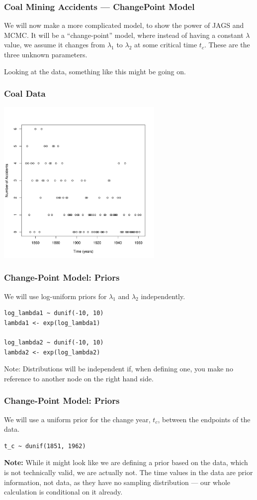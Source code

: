 \documentclass{beamer}
\begin{document}
\begin{frame}[fragile]
\frametitle{Coal Mining Accidents --- ChangePoint Model}
We will now make a more complicated model, to show the power of JAGS and
MCMC. It will be a
``change-point'' model, where instead of having a
constant $\lambda$ value, we assume it changes from
$\lambda_1$ to $\lambda_2$ at some critical time $t_c$.
These are the three unknown parameters.

Looking at the data, something like this might be going on.
\end{frame}

\begin{frame}[fragile]
\frametitle{Coal Data}

\centering
\includegraphics[width=0.6\textwidth]{images/coal.pdf}

\end{frame}


\begin{frame}[fragile]
\frametitle{Change-Point Model: Priors}
We will use log-uniform priors for $\lambda_1$ and $\lambda_2$ independently.
\begin{verbatim}
log_lambda1 ~ dunif(-10, 10)
lambda1 <- exp(log_lambda1)

log_lambda2 ~ dunif(-10, 10)
lambda2 <- exp(log_lambda2)
\end{verbatim}
\pause
Note: Distributions will be independent if, when defining one, you
make no reference to another node on the right hand side.

\end{frame}

\begin{frame}[fragile]
\frametitle{Change-Point Model: Priors}
We will use a uniform prior for the change year, $t_c$, between the
endpoints of the data.
\begin{verbatim}
t_c ~ dunif(1851, 1962)
\end{verbatim}
\pause

{\bf Note:}
While it might look like we are defining a prior based on the data,
which is not technically valid, we are actually not. The time values
in the data are prior information, not data, as they have no sampling
distribution --- our whole calculation is conditional on it already.

\end{frame}
\end{document}

